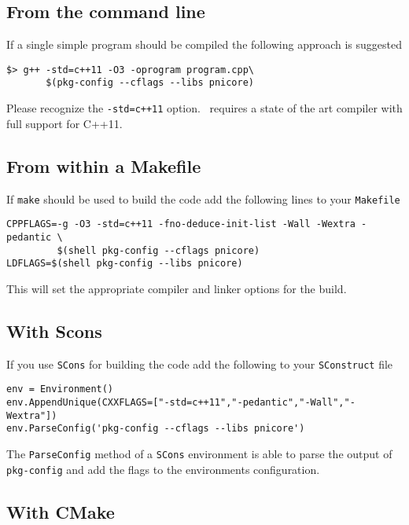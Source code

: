 \subsection{From the command line}

If a single simple program should be compiled the following approach is
suggested 
\begin{verbatim}
$> g++ -std=c++11 -O3 -oprogram program.cpp\
       $(pkg-config --cflags --libs pnicore)
\end{verbatim}
Please recognize the \texttt{-std=c++11} option. \libpnicore\ requires a state of
the art compiler with full support for C++11.

\subsection{From within a Makefile}

If \texttt{make} should be used to build the code add the following lines to your
\texttt{Makefile}

\begin{verbatim}
CPPFLAGS=-g -O3 -std=c++11 -fno-deduce-init-list -Wall -Wextra -pedantic \
		 $(shell pkg-config --cflags pnicore) 
LDFLAGS=$(shell pkg-config --libs pnicore)
\end{verbatim}
This will set the appropriate compiler and linker options for the build.

\subsection{With Scons}

If you use \texttt{SCons} for building the code add the following to your 
\texttt{SConstruct} file
\begin{verbatim}
env = Environment()
env.AppendUnique(CXXFLAGS=["-std=c++11","-pedantic","-Wall","-Wextra"])
env.ParseConfig('pkg-config --cflags --libs pnicore')
\end{verbatim}
The \texttt{ParseConfig} method of a \texttt{SCons} environment is able to parse the
output of \texttt{pkg-config} and add the flags to the environments configuration.

\subsection{With CMake}


